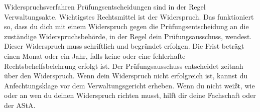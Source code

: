 \begin{artikel}{Widerspruchsverfahren}
Prüfungsentscheidungen sind in der Regel Verwaltungsakte. Wichtigstes Rechtsmittel ist der Widerspruch. Das funktioniert so, dass du dich mit einem Widerspruch gegen die Prüfungsentscheidung an die zuständige Widerspruchsbehörde, in der Regel dein Prüfungsausschuss, wendest. Dieser Widerspruch muss schriftlich und begründet erfolgen. Die Frist beträgt einen Monat oder ein Jahr, falls keine oder eine fehlerhafte Rechtsbehelfsbelehrung erfolgt ist. Der Prüfungsausschuss entscheidet zeitnah über den Widerspruch. Wenn dein Widerspruch nicht erfolgreich ist, kannst du Anfechtungsklage vor dem Verwaltungsgericht erheben. Wenn du nicht weißt, wie oder an wen du deinen Widerspruch richten musst, hilft dir deine Fachschaft oder der AStA.
\end{artikel}
